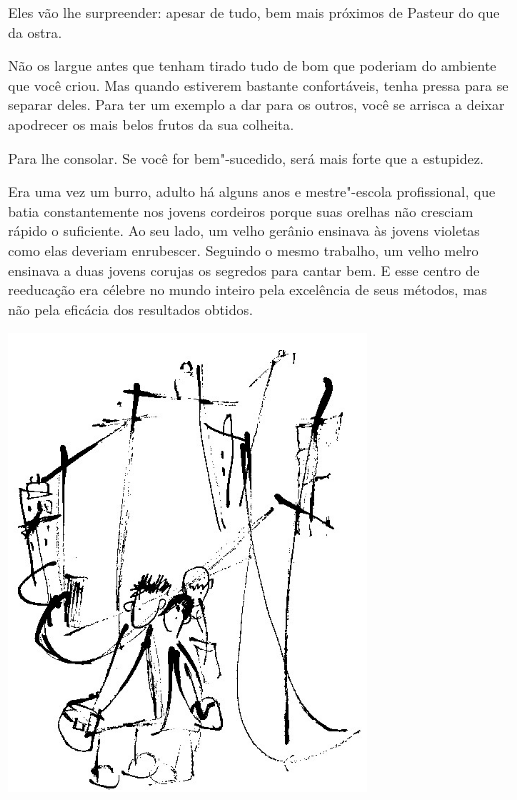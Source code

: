 \bigskip
\bigskip

Eles vão lhe surpreender: apesar de tudo, bem mais próximos de Pasteur
do que da ostra.

\bigskip
\bigskip

Não os largue antes que tenham tirado tudo de bom que poderiam do
ambiente que você criou. Mas quando estiverem bastante confortáveis,
tenha pressa para se separar deles. Para ter um exemplo a dar para os
outros, você se arrisca a deixar apodrecer os mais belos frutos da sua
colheita.

\bigskip
\bigskip

Para lhe consolar. Se você for bem"-sucedido, será mais forte que a
estupidez.

\bigskip
\bigskip

Era uma vez um burro, adulto há alguns anos e mestre"-escola
profissional, que batia constantemente nos jovens cordeiros porque suas
orelhas não cresciam rápido o suficiente. Ao seu lado, um velho gerânio
ensinava às jovens violetas como elas deveriam enrubescer. Seguindo o
mesmo trabalho, um velho melro ensinava a duas jovens corujas os
segredos para cantar bem. E esse centro de reeducação era célebre no
mundo inteiro pela excelência de seus métodos, mas não pela eficácia dos
resultados obtidos.

\bigskip
\bigskip

\pagebreak
\thispagestyle{empty}

\begin{vplace}[.50]
\begin{center}
\includegraphics[width=95mm]{./imgs/Image_12.jpg}
\end{center}
\end{vplace}


